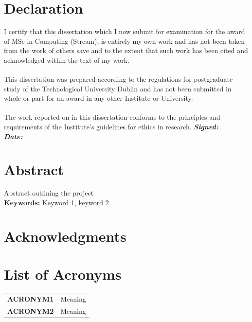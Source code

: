 \documentclass[oneside,12pt]{book}
\begin{document}
\chapter*{Declaration}
I certify that this dissertation which I now submit for examination for the award of
MSc in Computing (Stream), is entirely my own work and has not been taken
from the work of others save and to the extent that such work has been cited and
acknowledged within the text of my work.
\\
\\
This dissertation was prepared according to the regulations for postgraduate study of
the Technological University Dublin and has not been submitted in whole or part for an
award in any other Institute or University.
\\
\\
The work reported on in this dissertation conforms to the principles and requirements
of the Institute’s guidelines for ethics in research.
\vfill
\noindent
\textit{\textbf{Signed:}}  \\

\noindent
\textit{\textbf{Date:}}
\vspace{0.8cm}

\chapter*{Abstract}
\par Abstract outlining the project
\\
\vfill
\noindent
\textbf{Keywords:} \quad Keyword 1, keyword 2

\chapter*{Acknowledgments}

\newpage
\tableofcontents

\listoffigures

\listoftables

\chapter*{List of Acronyms}
\begin{table}[H]
  \centering
    \begin{tabular}{ l l }
    \textbf{ACRONYM1} & Meaning \\
    \textbf{ACRONYM2} & Meaning \\ 
    \end{tabular}
\end{table}
\end{document}

